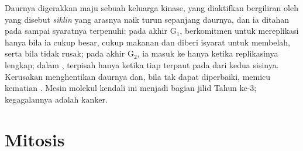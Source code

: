 \begin{proposition}\label{prop:b1:replication-mitosis:checkpoints}
Daurnya digerakkan maju sebuah keluarga  kinase, yang
diaktifkan bergiliran oleh  yang disebut \emph{siklin} yang
arasnya naik turun sepanjang daurnya, dan ia ditahan pada \emph{} sampai syaratnya terpenuhi: pada akhir G$_1$, 
berkomitmen untuk mereplikasi hanya bila ia cukup besar, cukup makanan
dan diberi isyarat untuk membelah, serta bila  tidak rusak; pada
akhir G$_2$, ia masuk ke  hanya ketika replikasinya lengkap;
dalam ,  terpisah hanya ketika tiap 
terpaut pada  dari kedua sisinya. Kerusakan menghentikan
daurnya dan, bila tak dapat diperbaiki, memicu kematian . Mesin
molekul kendali ini menjadi bagian jilid Tahun ke-3; kegagalannya
adalah kanker.
\end{proposition}

\section{Mitosis}

